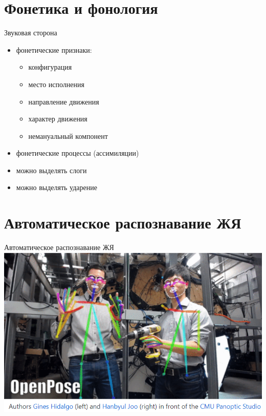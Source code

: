 \documentclass[13pt, t]{beamer}
\begin{document}
\section{Фонетика и фонология} %

\begin{frame}{Звуковая сторона}
\begin{itemize}
    \item фонетические признаки:
    \begin{itemize}
        \item конфигурация
        \item место исполнения
        \item направление движения
        \item характер движения
        \item немануальный компонент
    \end{itemize}
    \item фонетические процессы (ассимиляции)
    \item можно выделять слоги
    \item можно выделять ударение
\end{itemize}
\end{frame}

\section{Автоматическое распознавание ЖЯ} %
\begin{frame}{Автоматическое распознавание ЖЯ}
    \includegraphics[width=\linewidth]{images/open-pose}
\end{frame}
\end{document}
